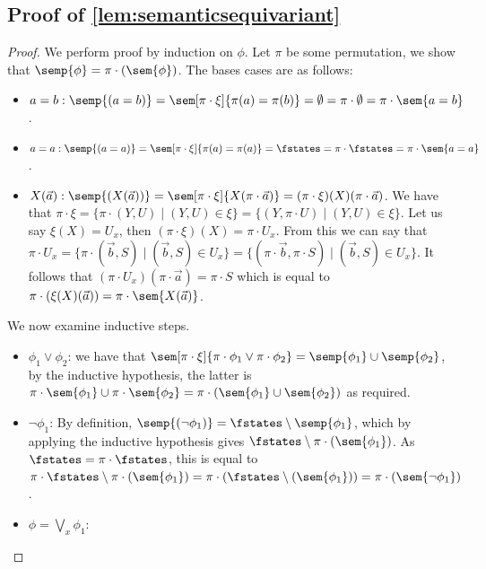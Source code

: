 \subsection{Proof of \cref{lem:semanticsequivariant}}
\semanticsequivariant*
\begin{proof}
	We perform proof by induction on $\phi$.
	Let $\pi$ be some permutation, we show that
	$\semp{\phi} = \pi\cdot(\sem{\phi})$.
	The bases cases are as follows:
	\begin{itemize}
		\item $a=b: \semp{(a=b)} = \sem[\pi\cdot \xi]{\pi(a) = \pi(b)} = \emptyset = \pi\cdot \emptyset = \pi\cdot\sem{a=b}$.
		\item $a=a: \semp{(a=a)} = \sem[\pi\cdot \xi]{\pi(a) = \pi(a)} = \fstates = \pi\cdot \fstates = \pi\cdot\sem{a=a}$.
		\item $X(\vec a): \semp{(X(\vec a))} = \sem[\pi\cdot\xi]{X(\pi\cdot \vec a)} = (\pi\cdot\xi)(X)(\pi\cdot \vec a)$.
		We have that $\pi\cdot\xi = \{\pi\cdot (Y, U)\mid (Y,U)\in \xi\} = \{(Y, \pi \cdot U)\mid (Y,U)\in \xi\}$. 
		Let us say $\xi(X) = U_x$, then $(\pi\cdot\xi)(X) = \pi\cdot U_x$. 
		From this we can say that $\pi\cdot U_x = \{\pi\cdot (\vec b, S)\mid (\vec b, S) \in U_x\}=\{(\pi\cdot \vec b, \pi\cdot S)\mid (\vec b, S) \in U_x\}$.
		It follows that $(\pi\cdot U_x)(\pi\cdot \vec a) = \pi\cdot S$
		which is equal to 
		$\pi\cdot (\xi(X)(\vec a)) = \pi\cdot \sem{X(\vec a)}$.
	\end{itemize}
	We now examine inductive steps.\
	\begin{itemize}
		\item $\phi_1 \vee \phi_2$:
		we have that $\sem[\pi\cdot \xi]{\pi\cdot \phi_1 \vee \pi\cdot \phi_2} = \semp{\phi_1} \cup \semp{\phi_2}$, by the inductive hypothesis, the latter is $\pi\cdot \sem{\phi_1} \cup \pi\cdot \sem{\phi_2}=\pi\cdot (\sem{\phi_1}\cup\sem{\phi_2})$ as required. 
		\item $\lnot \phi_1$: 
		By definition, $\semp{(\lnot\phi_1)} = \fstates\setminus\semp{\phi_1}$, which by applying the inductive hypothesis gives $\fstates\setminus\pi\cdot (\sem{\phi_1})$.
		As $\fstates = \pi\cdot \fstates$, this is equal to $\pi\cdot \fstates\setminus\pi\cdot (\sem{\phi_1})=\pi\cdot(\fstates\setminus(\sem{\phi_1}))=\pi\cdot(\sem{\lnot\phi_1})$. 
		\item $\phi=\bigvee_{x}\phi_1$:

\end{itemize}
\end{proof}
